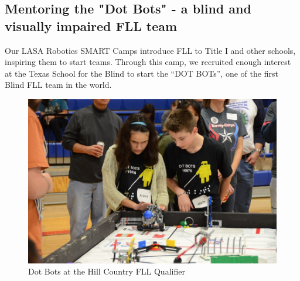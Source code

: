 \subsection{Mentoring the "Dot Bots" - a blind and visually impaired FLL team}
Our LASA Robotics SMART Camps introduce FLL to Title I and other schools, inspiring them to start teams. Through this camp, we recruited enough interest at the Texas School for the Blind to start the “DOT BOTs”, one of the first Blind FLL team in the world. 
\begin{figure}[H]
	\centering
	\includegraphics[height=0.8\linewidth]{dotbots}
	\caption[]{Dot Bots at the Hill Country FLL Qualifier}
	\label{fig:dotbots}
\end{figure}

